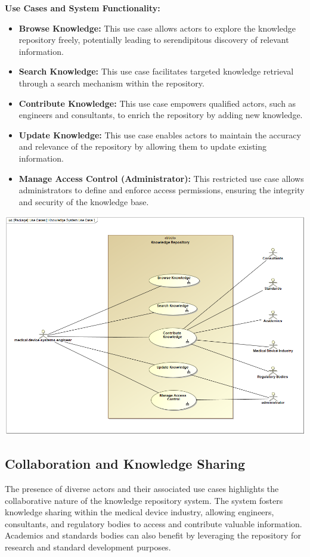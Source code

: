 \documentclass[
  letterpaper,
  DIV=11,
  numbers=noendperiod]{scrreprt}
\begin{document}
\textbf{Use Cases and System Functionality:}

\begin{itemize}
\item
  \textbf{Browse Knowledge:} This use case allows actors to explore the
  knowledge repository freely, potentially leading to serendipitous
  discovery of relevant information.
\item
  \textbf{Search Knowledge:} This use case facilitates targeted
  knowledge retrieval through a search mechanism within the repository.
\item
  \textbf{Contribute Knowledge:} This use case empowers qualified
  actors, such as engineers and consultants, to enrich the repository by
  adding new knowledge.
\item
  \textbf{Update Knowledge:} This use case enables actors to maintain
  the accuracy and relevance of the repository by allowing them to
  update existing information.
\item
  \textbf{Manage Access Control (Administrator):} This restricted use
  case allows administrators to define and enforce access permissions,
  ensuring the integrity and security of the knowledge base.
\end{itemize}

\includegraphics{images/paste-2.png}

\subsection{Collaboration and Knowledge
Sharing}\label{collaboration-and-knowledge-sharing}

The presence of diverse actors and their associated use cases highlights
the collaborative nature of the knowledge repository system. The system
fosters knowledge sharing within the medical device industry, allowing
engineers, consultants, and regulatory bodies to access and contribute
valuable information. Academics and standards bodies can also benefit by
leveraging the repository for research and standard development
purposes.
\end{document}
